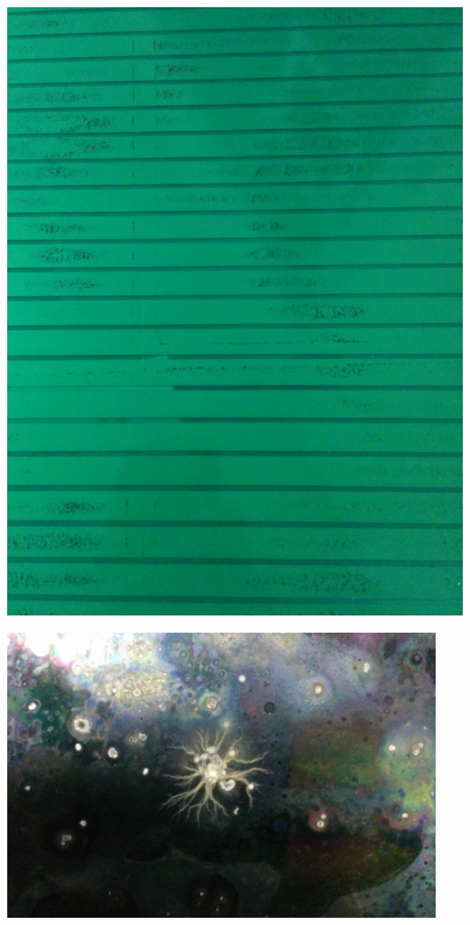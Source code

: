 \noindent
\begin{minipage}[th!]{1\textwidth}
	\addtocounter{figure}{1}
	\centering
	\noindent
	\begin{minipage}[th!]{0.48\textwidth}
		\noindent
		\centering
		\begin{minipage}[th!]{1\textwidth}
			\noindent
			\centering
			\includegraphics[width=1\textwidth]{GLA/peinture.jpg}
		\end{minipage}%
		\renewcommand\thesubfigure{\alph{subfigure}}
		\label{peinture}
	\end{minipage}%
	\hfill
	\begin{minipage}[th!]{0.48\textwidth}
		\noindent
		\centering
			\begin{minipage}[th!]{1\textwidth}
		\noindent
		\centering
		\includegraphics[width=0.94\textwidth]{GLA/depot2.jpg}

\end{minipage}
\end{minipage}
\end{minipage}
